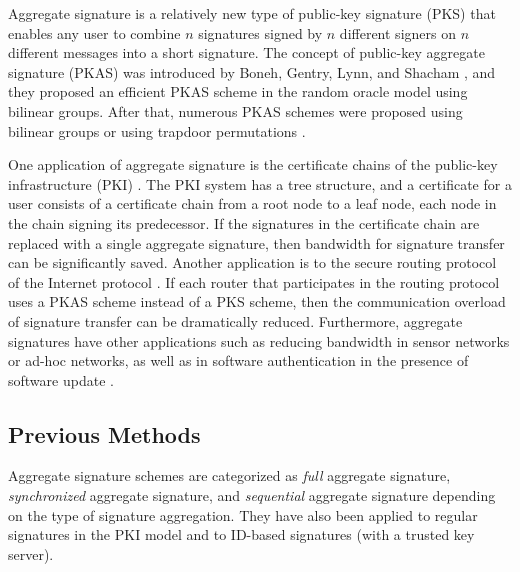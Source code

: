 \documentclass[11pt,letterpaper]{article}
\begin{document}
Aggregate signature is a relatively new type of public-key signature (PKS)
that enables any user to combine $n$ signatures signed by $n$ different
signers on $n$ different messages into a short signature. The concept of
public-key aggregate signature (PKAS) was introduced by Boneh, Gentry, Lynn,
and Shacham \cite{BonehGLS03}, and they proposed an efficient PKAS scheme in
the random oracle model using bilinear groups. After that, numerous PKAS
schemes were proposed using bilinear groups \cite{GentryR06,LuOSSW06,
LuOSSW13,BoldyrevaGOY07,BoldyrevaGOY10,AhnGH10,GerbushLOW12} or using
trapdoor permutations \cite{LysyanskayaMRS04,BellareNN07,Neven08}.

One application of aggregate signature is the certificate chains of the
public-key infrastructure (PKI) \cite{BonehGLS03}. The PKI system has a tree
structure, and a certificate for a user consists of a certificate chain from
a root node to a leaf node, each node in the chain signing its predecessor.
If the signatures in the certificate chain are replaced with a single
aggregate signature, then bandwidth for signature transfer can be
significantly saved. Another application is to the secure routing protocol of
the Internet protocol \cite{BonehGLS03}. If each router that participates in
the routing protocol uses a PKAS scheme instead of a PKS scheme, then the
communication overload of signature transfer can be dramatically reduced.
Furthermore, aggregate signatures have other applications such as reducing
bandwidth in sensor networks or ad-hoc networks, as well as in software
authentication in the presence of software update \cite{AhnGH10}.

\subsection{Previous Methods}

Aggregate signature schemes are categorized as {\it full} aggregate
signature, {\it synchronized} aggregate signature, and {\it sequential}
aggregate signature depending on the type of signature aggregation. They have
also been applied to regular signatures in the PKI model and to ID-based
signatures (with a trusted key server).
\end{document}
